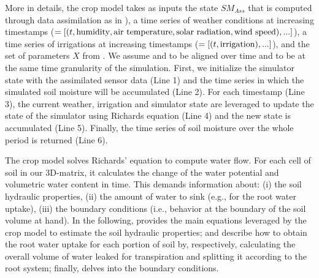 More in details, the crop model takes as inputs the state $SM_{Ass}$ that is computed through data assimilation as in ), a time series of weather conditions at increasing timestamps (\Wt$=[(t, \textup{humidity}, \textup{air temperature}, \textup{solar radiation}, \textup{wind speed}), ...]$), a time series of irrigations at increasing timestamps (\It$=[(t, \textup{irrigation}), ...]$), and the set of parameters $X$ from .
We assume \Wt{} and \It{} to be aligned over time and to be at the same time granularity of the simulation.
First, we initialize the simulator state with the assimilated sensor data (Line 1) and the time series in which the simulated soil moisture will be accumulated (Line 2).
For each timestamp (Line 3), the current weather, irrigation and  simulator state are leveraged to update the state of the simulator using Richards equation (Line 4) and the new state is accumulated (Line 5).
Finally, the time series of soil moisture over the whole period is returned (Line 6).

The crop model solves Richards' equation \cite{richards1931capillary} to compute water flow.
For each cell of soil in our 3D-matrix, it calculates the change of the water potential and volumetric water content in time.
This demands information about: (i) the soil hydraulic properties, (ii) the amount of water to sink (e.g., for the root water uptake), (iii) the boundary conditions (i.e., behavior at the boundary of the soil volume at hand).
In the following,  provides the main equations leveraged by the crop model to estimate the soil hydraulic properties;  and  describe how to obtain the root water uptake for each portion of soil by, respectively, calculating the overall volume of water leaked for transpiration and splitting it according to the root system; finally,  delves into the boundary conditions.

